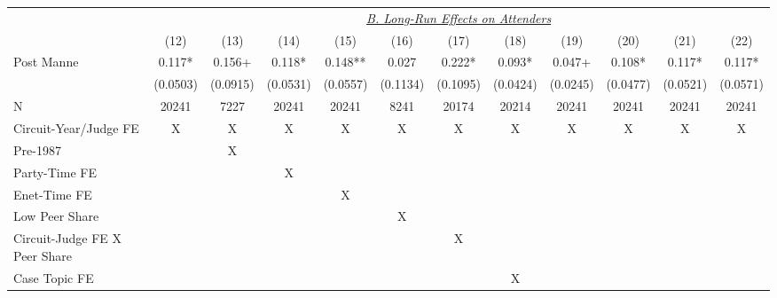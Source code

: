 \begin{center}
{\begin{tabular}{l*{11}{c}}
                    &\multicolumn{11}{c}{\uline{\textit{B. Long-Run Effects on Attenders}}}                                                                                              \\
                    &        (12)  &        (13)  &        (14)  &        (15)  &        (16)  &        (17)  &        (18)  &        (19)  &        (20)  &        (21)  &        (22)  \\
\cmidrule(lr){2-12}
Post Manne          &       0.117* &       0.156+ &       0.118* &       0.148**&       0.027  &       0.222* &       0.093* &       0.047+ &       0.108* &       0.117* &       0.117* \\
                    &    (0.0503)  &    (0.0915)  &    (0.0531)  &    (0.0557)  &    (0.1134)  &    (0.1095)  &    (0.0424)  &    (0.0245)  &    (0.0477)  &    (0.0521)  &    (0.0571)  \\
\cmidrule(lr){1-12}
N                   &       20241  &        7227  &       20241  &       20241  &        8241  &       20174  &       20214  &       20241  &       20241  &       20241  &       20241  \\
Circuit-Year/Judge FE&           X  &           X  &           X  &           X  &           X  &           X  &           X  &           X  &           X  &           X  &           X  \\
Pre-1987            &              &           X  &              &              &              &              &              &              &              &              &              \\
Party-Time FE       &              &              &           X  &              &              &              &              &              &              &              &              \\
Enet-Time FE        &              &              &              &           X  &              &              &              &              &              &              &              \\
Low Peer Share      &              &              &              &              &           X  &              &              &              &              &              &              \\
Circuit-Judge FE X Peer Share&              &              &              &              &              &           X  &              &              &              &              &              \\
Case Topic FE       &              &              &              &              &              &              &           X  &              &              &              &              \\

\end{tabular}}
\end{center}
